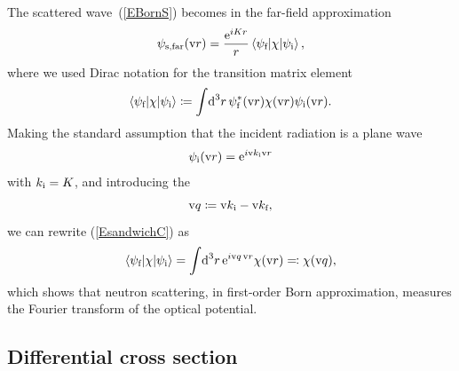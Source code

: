 The scattered wave~(\ref{EBornS})
becomes in the far-field approximation 
\begin{equation}\label{EsandwichC}
  \psi_\text{s,far}(\text{v}{r})
  = \frac{\text{e}^{iKr}}{r}
    \left\langle \psi_{\text{f}}|\chi|\psi_{\text{i}}\right\rangle,
\end{equation}
%
where we used Dirac notation for the transition matrix element
%
\begin{equation}\label{Etrama}
  \left\langle \psi_{\text{f}}|\chi|\psi_{\text{i}}\right\rangle
  \coloneqq  \int\!\text{d}^3r\, \psi^*_{\text{f}}(\text{v}{r})\chi(\text{v}{r})\psi_{\text{i}}(\text{v}{r}).
\end{equation}
%
Making the standard assumption
that the incident radiation is a plane wave
\begin{equation}\label{EPsi0Plane}
  \psi_{\text{i}}(\text{v}{r})=\text{e}^{i \text{v}{k}_{\text{i}} \text{v}{r}}
\end{equation}
with $k_{\text{i}}=K$,
and introducing the 
%
\begin{equation}\label{Eq}
  \text{v}{q}\coloneqq \text{v}{k}_{\text{i}}-\text{v}{k}_{\text{f}},
\end{equation}
%
we can rewrite (\ref{EsandwichC}) as
\begin{equation}\label{EBornQ}
  \left\langle \psi_{\text{f}}|\chi|\psi_{\text{i}}\right\rangle
  = \int\!\text{d}^3r\, \text{e}^{i\text{v}{q}\,\text{v}{r}}\chi(\text{v}{r})
  \eqqcolon  \chi(\text{v}{q}),
\end{equation}
%
which shows that neutron scattering,
in first-order Born approximation,
measures the Fourier transform
of the optical potential.
%

%

\subsection{Differential cross section}\label{SdiffCross}

